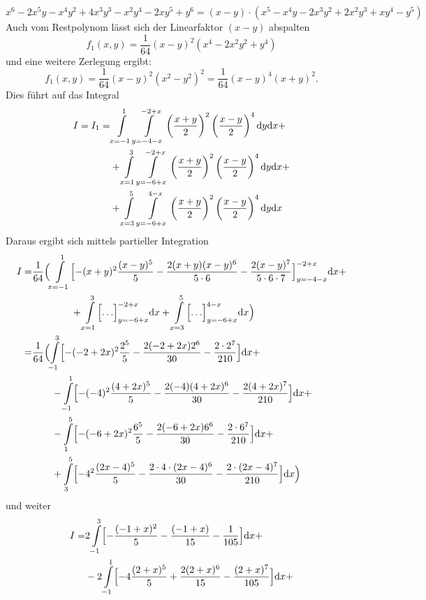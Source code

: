 {%
$$x^6-2x^5y-x^4y^2 +4x^3y^3-x^2y^4-2xy^5+y^6=(x-y)\cdot(x^5 -x^4 y -2x^3y^2+2x^2y^3+xy^4- y^5)$$
Auch vom Restpolynom l\"asst sich der Linearfaktor $(x-y)$ abspalten
$$f_1(x,y)=\frac 1{64}(x-y)^2(x^4-2x^2y^2+y^4)$$
und eine weitere Zerlegung ergibt: 
$$f_1(x,y)=\frac 1{64}(x-y)^2(x^2-y^2)^2=\frac 1{64}(x-y)^4(x+y)^2.$$
Dies f\"uhrt auf das Integral
\begin{align*}
I=I_1=&  \int\limits_{x=-1}^1\int\limits_{y=-4-x}^{-2+x} \left( \frac{x+y}2\right)^2 \left( \frac{x-y}2\right)^4
 \mathrm{d} y \mathrm{d} x +\\
&+ \int\limits_{x=1}^3\int\limits_{y=-6+x}^{-2+x} \left( \frac{x+y}2\right)^2 \left( \frac{x-y}2\right)^4
 \mathrm{d} y \mathrm{d} x+\\
&+  \int\limits_{x=3}^5\int\limits_{y=-6+x}^{4-x} \left( \frac{x+y}2\right)^2 \left( \frac{x-y}2\right)^4
 \mathrm{d} y \mathrm{d} x
\end{align*}
Daraus ergibt sich mittels partieller Integration
\begin{align*}
I=& \frac 1{64}\Bigl(\int\limits_{x=-1}^1\Bigl[-(x+y)^2\frac{(x-y)^5}5
- \frac{2(x+y)(x-y)^6}{5\cdot 6} - \frac{2(x-y)^7}{5\cdot 6\cdot 7}\Bigr]_{y=-4-x}^{-2+x}\mathrm{d} x +\\
&\qquad\qquad +\int\limits_{x=1}^3\Bigl[\hdots\Bigr]_{y=-6+x}^{-2+x}\mathrm{d} x
+ \int\limits_{x=3}^5\Bigl[\hdots\Bigr]_{y=-6+x}^{4-x}\mathrm{d} x\Bigr)\\
=&\frac{1}{64}\Bigl( \int\limits_{-1}^3\Bigl[-(-2+2x)^2\frac{2^5}5-\frac{2(-2+2x)2^6}{30}-\frac{2\cdot
 2^7}{210}\Bigr]\mathrm{d} x+ \\
& \qquad - \int\limits_{-1}^1\Bigl[ -(-4)^2\frac{(4+2x)^5}5 - \frac{2(-4)(4+2x)^6}{30}-\frac{2(4+2x)^7}{210}\Bigr]\mathrm{d} x+\\
&\qquad -\int\limits_{1}^5\Bigl[ -(-6+2x)^2\frac{6^5}5
- \frac{2(-6+2x)6^6}{30}-\frac{2\cdot 6^7}{210}\Bigr]\mathrm{d} x+\\
&\qquad + \int\limits_{3}^5\Bigl[ -4^2\frac{(2x-4)^5}5-\frac{2\cdot 4 \cdot
 (2x-4)^6}{30}-\frac{2\cdot (2x-4)^7}{210}\Bigr]\mathrm{d} x\Bigr)
\end{align*}
und weiter
\begin{align*}
I=& 2\int\limits_{-1}^3\Bigl[-\frac{(-1+x)^2}5-\frac{(-1+x)}{15}-\frac{1}{105}\Bigr]\d x + \\
& - 2\int\limits_{-1}^1\Bigl[ -4\frac{(2+x)^5}5 + \frac{2(2+x)^6}{15}-\frac{(2+x)^7}{105}\Bigr]\d x+\\

\end{align*}}
